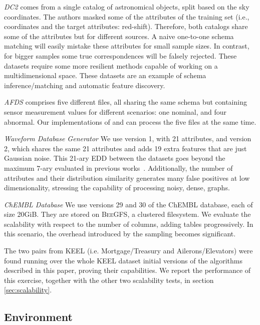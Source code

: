 \emph{DC2} comes from a single catalog of astronomical
    objects, split based on the sky coordinates.
    The authors masked some of the attributes of the training set (i.e., coordinates and the
    target attributes: red-shift). 
    Therefore, both catalogs share some of the attributes but for different sources.
    A naive one-to-one schema matching will
    easily mistake these attributes for small sample sizes. In contrast, for bigger samples
    some true correspondences will be falsely rejected.
    These datasets require some more resilient methods capable of working on a
    multidimensional space.
    These datasets are an example of schema inference/matching and automatic feature discovery.
    
\emph{\gls{AFDS}} comprises five different files,
    all sharing the same schema but containing sensor measurement values for different scenarios:
    one nominal, and four abnormal. Our implementations of \Find and \PresQ can process
    the five files at the same time.

\emph{Waveform Database Generator}
    We use version 1, with 21 attributes, and version 2, which shares the same 21 attributes and adds 19
    extra features that are just Gaussian noise. This 21-ary \gls{EDD} between the datasets goes
    beyond the maximum 7-ary evaluated in previous works~\cite{Dursch2019}.
    Additionally, the number of attributes and their distribution similarity generates many false positives at low
    dimensionality, stressing the capability of processing noisy, dense, graphs.

\emph{ChEMBL Database}
    We use versions 29 and 30 of the ChEMBL database, each of size 20GiB. They are
    stored on \textsc{BeeGFS}, a clustered filesystem. We evaluate the scalability with respect to the number of
    columns, adding tables progressively. In this scenario, the overhead introduced by the sampling becomes significant.

The two pairs from KEEL (i.e. Mortgage/Treasury and Ailerons/Elevators) were found
running over the whole KEEL dataset initial versions of the algorithms described in
this paper, proving their capabilities. We report the performance of this exercise, together
with the other two scalability tests, in section \ref{sec:scalability}.

\subsection{Environment}

